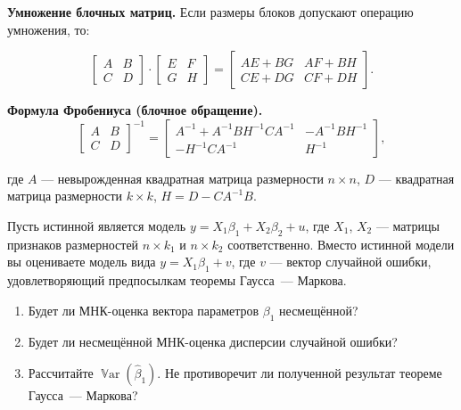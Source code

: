 \documentclass[12pt]{article}
\DeclareMathOperator{\Var}{\mathbb{V}ar}
\renewcommand{\b}{\beta}
\newcommand{\hb}{\hat{\beta}}
\begin{document}
\textbf{Умножение блочных матриц.} Если размеры блоков допускают операцию умножения, то:

\[
\left[
\begin{array}{c|c}
A & B \\
\hline
C & D
\end{array}
\right]
\cdot
\left[
\begin{array}{c|c}
E & F \\
\hline
G & H
\end{array}
\right]
=
\left[
\begin{array}{c|c}
AE + BG &  AF+BH\\
\hline
CE+DG & CF+DH
\end{array}
\right].
\]

\bigskip

\textbf{Формула Фробениуса (блочное обращение).}
\[
\left[
\begin{array}{c|c}
A & B \\
\hline
C & D
\end{array}
\right]^{-1}=
\left[
\begin{array}{c|c}
A^{-1}+A^{-1}BH^{-1}CA^{-1} & -A^{-1}BH^{-1} \\
\hline
-H^{-1}CA^{-1} & H^{-1}
\end{array}
\right],
\]

где $A$ --- невырожденная квадратная матрица размерности $n \times n$, $D$ --- квадратная матрица размерности $k \times k$, $H = D - CA^{-1}B$.

\begin{problem}
Пусть истинной является модель $y = X_1\b_1+ X_2\b_2+u$, где $X_1$, $X_2$  --- матрицы признаков размерностей $n \times k_1$ и $n \times k_2$ соответственно. Вместо истинной модели вы оцениваете модель вида $y = X_1\b_1+v$, где $v$ --- вектор случайной ошибки, удовлетворяющий предпосылкам теоремы Гаусса~--- Маркова.
\begin{enumerate}
    \item Будет ли МНК-оценка вектора параметров $\b_1$ несмещённой?
    \item Будет ли несмещённой МНК-оценка дисперсии случайной ошибки?
    \item Рассчитайте $\Var(\hb_1)$. Не противоречит ли полученной результат теореме Гаусса~--- Маркова?
\end{enumerate}
\end{problem}
\end{document}
